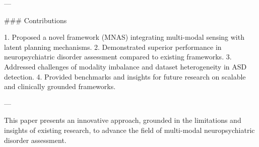 ---

### Contributions

1. Proposed a novel framework (MNAS) integrating multi-modal sensing with latent planning mechanisms.
2. Demonstrated superior performance in neuropsychiatric disorder assessment compared to existing frameworks.
3. Addressed challenges of modality imbalance and dataset heterogeneity in ASD detection.
4. Provided benchmarks and insights for future research on scalable and clinically grounded frameworks.

---

This paper presents an innovative approach, grounded in the limitations and insights of existing research, to advance the field of multi-modal neuropsychiatric disorder assessment.